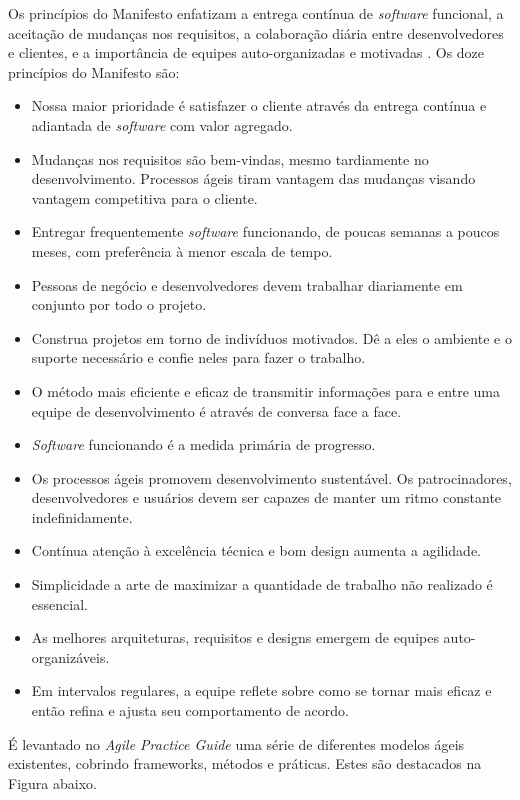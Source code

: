\documentclass[
	12pt,
	openright,
	twoside,
	a4paper,
	english,
	brazil
	]{abntex2}
\begin{document}
Os princípios do Manifesto enfatizam a entrega contínua de \textit{software} funcional, a aceitação de mudanças nos requisitos, a colaboração diária entre desenvolvedores e clientes, e a importância de equipes auto-organizadas e motivadas \cite{AgileManifest}. Os doze princípios do Manifesto são:
\begin{itemize}
  \item Nossa maior prioridade é satisfazer o cliente através da entrega contínua e adiantada de \textit{software} com valor agregado.
  \item Mudanças nos requisitos são bem-vindas, mesmo tardiamente no desenvolvimento. Processos ágeis tiram vantagem das mudanças visando vantagem competitiva para o cliente.
  \item Entregar frequentemente \textit{software} funcionando, de poucas semanas a poucos meses, com preferência à menor escala de tempo.
  \item Pessoas de negócio e desenvolvedores devem trabalhar diariamente em conjunto por todo o projeto.
  \item Construa projetos em torno de indivíduos motivados. Dê a eles o ambiente e o suporte necessário e confie neles para fazer o trabalho.
  \item O método mais eficiente e eficaz de transmitir informações para e entre uma equipe de desenvolvimento é através de conversa face a face.
  \item \textit{Software} funcionando é a medida primária de progresso.
  \item Os processos ágeis promovem desenvolvimento sustentável. Os patrocinadores, desenvolvedores e usuários devem ser capazes de manter um ritmo constante indefinidamente.
  \item Contínua atenção à excelência técnica e bom design aumenta a agilidade.
  \item Simplicidade \- a arte de maximizar a quantidade de trabalho não realizado \- é essencial.
  \item As melhores arquiteturas, requisitos e designs emergem de equipes auto-organizáveis.
  \item Em intervalos regulares, a equipe reflete sobre como se tornar mais eficaz e então refina e ajusta seu comportamento de acordo.
\end{itemize}

É levantado no \textit{Agile Practice Guide} \cite{AgileGuide} uma série de diferentes modelos ágeis existentes, cobrindo frameworks, métodos e práticas. Estes são destacados na Figura abaixo.
\end{document}

